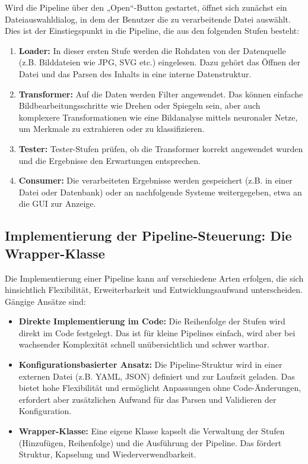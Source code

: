 \documentclass[10pt,a4paper]{article}
\begin{document}
Wird die Pipeline über den „Open“-Button gestartet, öffnet sich zunächst ein Dateiauswahldialog, in dem der Benutzer die zu verarbeitende Datei auswählt. Dies ist der Einstiegspunkt in die Pipeline, die aus den folgenden Stufen besteht:

\begin{enumerate}
    \item \textbf{Loader:} In dieser ersten Stufe werden die Rohdaten von der Datenquelle (z.B. Bilddateien wie JPG, SVG etc.) eingelesen. Dazu gehört das Öffnen der Datei und das Parsen des Inhalts in eine interne Datenstruktur.
    \item \textbf{Transformer:} Auf die Daten werden Filter angewendet. Das können einfache Bildbearbeitungsschritte wie Drehen oder Spiegeln sein, aber auch komplexere Transformationen wie eine Bildanalyse mittels neuronaler Netze, um Merkmale zu extrahieren oder zu klassifizieren.
    \item \textbf{Tester:} Tester-Stufen prüfen, ob die Transformer korrekt angewendet wurden und die Ergebnisse den Erwartungen entsprechen.
    \item \textbf{Consumer:} Die verarbeiteten Ergebnisse werden gespeichert (z.B. in einer Datei oder Datenbank) oder an nachfolgende Systeme weitergegeben, etwa an die GUI zur Anzeige.
\end{enumerate}


\subsection{Implementierung der Pipeline-Steuerung: Die Wrapper-Klasse}
Die Implementierung einer Pipeline kann auf verschiedene Arten erfolgen, die sich hinsichtlich Flexibilität, Erweiterbarkeit und Entwicklungsaufwand unterscheiden. Gängige Ansätze sind:


\begin{itemize}
    \item \textbf{Direkte Implementierung im Code:} Die Reihenfolge der Stufen wird direkt im Code festgelegt. Das ist für kleine Pipelines einfach, wird aber bei wachsender Komplexität schnell unübersichtlich und schwer wartbar.
    \item \textbf{Konfigurationsbasierter Ansatz:} Die Pipeline-Struktur wird in einer externen Datei (z.B. YAML, JSON) definiert und zur Laufzeit geladen. Das bietet hohe Flexibilität und ermöglicht Anpassungen ohne Code-Änderungen, erfordert aber zusätzlichen Aufwand für das Parsen und Validieren der Konfiguration.
    \item \textbf{Wrapper-Klasse:} Eine eigene Klasse kapselt die Verwaltung der Stufen (Hinzufügen, Reihenfolge) und die Ausführung der Pipeline. Das fördert Struktur, Kapselung und Wiederverwendbarkeit.
\end{itemize}
\end{document}
